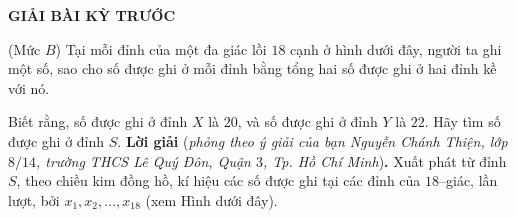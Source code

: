\centerline{{\large{\textbf{\color{thachthuctoanhoc}GIẢI BÀI KỲ TRƯỚC}}}}
\vspace*{-5pt}
\begin{multicols}{2}
	\setlength{\abovedisplayskip}{4pt}
	\setlength{\belowdisplayskip}{4pt}
	{}
	(Mức $B$)
	Tại mỗi đỉnh của một đa giác lồi $18$ cạnh ở hình dưới đây, người ta ghi một số, sao cho số được ghi ở mỗi đỉnh bằng tổng hai số được ghi ở hai đỉnh kề với nó.
	
	
	Biết rằng, số được ghi ở đỉnh $X$ là $20$, và số được ghi ở đỉnh $Y$ là $22$. Hãy tìm số được ghi ở đỉnh $S$.
	\vskip 0.05cm
	\textbf{Lời giải} (\textit{phỏng theo ý giải của bạn Nguyễn Chánh Thiện, lớp $8/14$, trường THCS Lê Quý Đôn, Quận $3$, Tp. Hồ Chí Minh})\textbf{.}
	\vskip 0.05cm
	Xuất phát từ đỉnh $S$, theo chiều kim đồng hồ, kí hiệu các số được ghi tại các đỉnh của $18$--giác, lần lượt, bởi  $x_1,  x_2, \ldots, x_{18}$ (xem Hình dưới đây).
	

\end{multicols}
